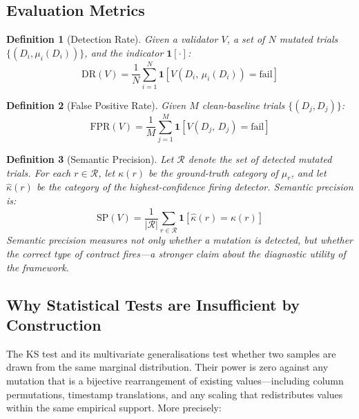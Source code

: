 \documentclass[journal]{IEEEtran}
\newtheorem{definition}{Definition}
\begin{document}
\subsection{Evaluation Metrics}

\begin{definition}[Detection Rate]
Given a validator $V$, a set of $N$ mutated trials $\{(D_i, \mu_i(D_i))\}$,
and the indicator $\mathbf{1}[\cdot]$:
\begin{equation}
\mathrm{DR}(V) = \frac{1}{N} \sum_{i=1}^{N}
\mathbf{1}\!\left[V\!\left(D_i,\, \mu_i(D_i)\right) = \mathrm{fail}\right]
\label{eq:dr}
\end{equation}
\end{definition}

\begin{definition}[False Positive Rate]
Given $M$ clean-baseline trials $\{(D_j, D_j)\}$:
\begin{equation}
\mathrm{FPR}(V) = \frac{1}{M} \sum_{j=1}^{M}
\mathbf{1}\!\left[V\!\left(D_j,\, D_j\right) = \mathrm{fail}\right]
\label{eq:fpr}
\end{equation}
\end{definition}

\begin{definition}[Semantic Precision]
Let $\mathcal{R}$ denote the set of detected mutated trials.  For each
$r \in \mathcal{R}$, let $\kappa(r)$ be the ground-truth category of
$\mu_r$, and let $\hat{\kappa}(r)$ be the category of the highest-confidence
firing detector.  Semantic precision is:
\begin{equation}
\mathrm{SP}(V) = \frac{1}{|\mathcal{R}|}
\sum_{r \in \mathcal{R}} \mathbf{1}\!\left[\hat{\kappa}(r) = \kappa(r)\right]
\label{eq:sp}
\end{equation}
Semantic precision measures not only whether a mutation is detected, but
whether the \emph{correct type of contract} fires---a stronger claim about
the diagnostic utility of the framework.
\end{definition}

\subsection{Why Statistical Tests are Insufficient by Construction}

The KS test and its multivariate generalisations test whether two samples
are drawn from the same marginal distribution.  Their power is zero against
any mutation that is a bijective rearrangement of existing values---including
column permutations, timestamp translations, and any scaling that
redistributes values within the same empirical support.  More precisely:
\end{document}
